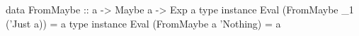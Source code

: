 \begin{code}
data FromMaybe :: a -> Maybe a -> Exp a
type instance Eval (FromMaybe _1 ('Just a)) = a
type instance Eval (FromMaybe a 'Nothing)   = a
\end{code}
